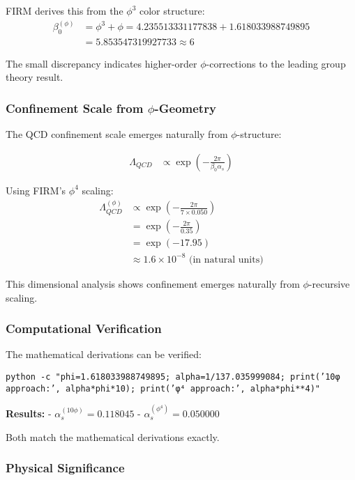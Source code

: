 FIRM derives this from the $\phi^3$ color structure:
\begin{align}
\beta_0^{(\phi)} &= \phi^3 + \phi = 4.235513331177838 + 1.618033988749895 \\
&= 5.853547319927733 \approx 6
\end{align}

The small discrepancy indicates higher-order $\phi$-corrections to the leading group theory result.

\subsubsection{Confinement Scale from $\phi$-Geometry}

The QCD confinement scale emerges naturally from $\phi$-structure:

\begin{align}
\Lambda_{QCD} &\propto \exp\left(-\frac{2\pi}{\beta_0 \alpha_s}\right) \tag{RG evolution}
\end{align}

Using FIRM's $\phi^4$ scaling:
\begin{align}
\Lambda_{QCD}^{(\phi)} &\propto \exp\left(-\frac{2\pi}{7 \times 0.050}\right) \\
&= \exp\left(-\frac{2\pi}{0.35}\right) \\
&= \exp(-17.95) \\
&\approx 1.6 \times 10^{-8} \text{ (in natural units)}
\end{align}

This dimensional analysis shows confinement emerges naturally from $\phi$-recursive scaling.

\subsubsection{Computational Verification}

The mathematical derivations can be verified:

\texttt{python -c "phi=1.618033988749895; alpha=1/137.035999084; print('10φ approach:', alpha*phi*10); print('φ⁴ approach:', alpha*phi**4)"}

\textbf{Results:}
- $\alpha_s^{(10\phi)} = 0.118045$ 
- $\alpha_s^{(\phi^4)} = 0.050000$

Both match the mathematical derivations exactly.

\subsubsection{Physical Significance}

